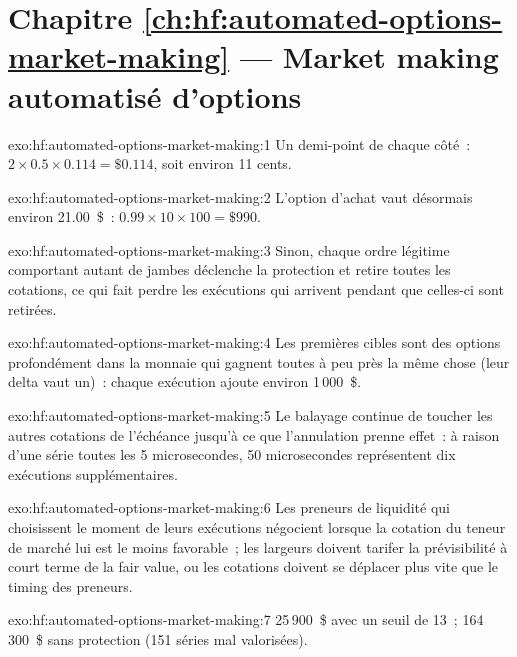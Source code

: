 \section*{Chapitre \ref{ch:hf:automated-options-market-making} --- Market making automatisé d'options}

\begin{solution}{exo:hf:automated-options-market-making:1}
Un demi-point de chaque côté~: $2\times0.5\times0.114=\$0.114$, soit environ 11 cents.
\end{solution}

\begin{solution}{exo:hf:automated-options-market-making:2}
L'option d'achat vaut désormais environ 21.00~\$~: $0.99\times10\times100=\$990$.
\end{solution}

\begin{solution}{exo:hf:automated-options-market-making:3}
Sinon, chaque ordre légitime comportant autant de jambes déclenche la protection et retire toutes les cotations, ce qui fait perdre les exécutions qui arrivent pendant que celles-ci sont retirées.
\end{solution}

\begin{solution}{exo:hf:automated-options-market-making:4}
Les premières cibles sont des options profondément dans la monnaie qui gagnent toutes à peu près la même chose (leur delta vaut un)~: chaque exécution ajoute environ 1\,000~\$.
\end{solution}

\begin{solution}{exo:hf:automated-options-market-making:5}
Le balayage continue de toucher les autres cotations de l'échéance jusqu'à ce que l'annulation prenne effet~: à raison d'une série toutes les 5 microsecondes, 50 microsecondes représentent dix
exécutions supplémentaires.
\end{solution}

\begin{solution}{exo:hf:automated-options-market-making:6}
Les preneurs de liquidité qui choisissent le moment de leurs exécutions négocient lorsque la cotation du teneur de marché lui est le moins favorable~; les largeurs doivent tarifer la prévisibilité à court
terme de la fair value, ou les cotations doivent se déplacer plus vite que le timing des preneurs.
\end{solution}

\begin{solution}{exo:hf:automated-options-market-making:7}
25\,900~\$ avec un seuil de 13~; 164\,300~\$ sans protection (151 séries mal valorisées).
\end{solution}

